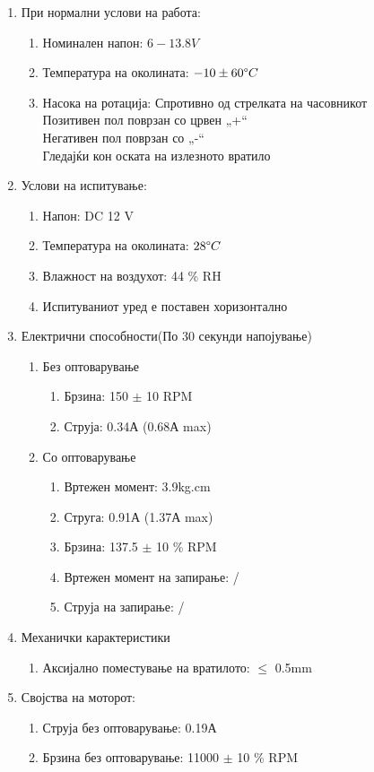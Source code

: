 \documentclass{article}
\begin{document}
\renewcommand{\theenumii}{\arabic{enumii}}
\renewcommand{\theenumiii}{\arabic{enumiii}}
\begin{enumerate}
	\item При нормални услови на работа:
	\begin{enumerate}
		\item Номинален напон: $ 6-13.8 V $
		\item Температура на околината: $ -10 \pm 60 \degree C $
		\item Насока на ротација: Спротивно од стрелката на часовникот\\Позитивен пол поврзан со црвен „+“\\Негативен пол поврзан со „-“\\Гледајќи кон оската на излезното вратило		
	\end{enumerate}
	\item Услови на испитување:
	\begin{enumerate}
		\item Напон: DC 12 V
		\item Температура на околината: $ 28 \degree C $
		\item Влажност на воздухот: 44 \% RH
		\item Испитуваниот уред е поставен хоризонтално
	\end{enumerate}
	\item Електрични способности(По 30 секунди напојување)
	\begin{enumerate}
		\item Без оптоварување
		\begin{enumerate}
			\item Брзина: 150 $\pm$ 10 RPM
			\item Струја: 0.34А (0.68А max)
		\end{enumerate}
		\item Со оптоварување
		\begin{enumerate}
			\item Вртежен момент: 3.9kg.cm
			\item Струга: 0.91А (1.37А max)
			\item Брзина: 137.5 $\pm$ 10 \% RPM
			\item Вртежен момент на запирање: /
			\item Струја на запирање: /
		\end{enumerate}
	\end{enumerate}
	\item Механички карактеристики
	\begin{enumerate}
		\item Аксијално поместување на вратилото: $\leq$ 0.5mm
	\end{enumerate}
	\item Својства на моторот:
	\begin{enumerate}
		\item Струја без оптоварување: 0.19А
		\item Брзина без оптоварување: 11000 $\pm$ 10 \% RPM
	\end{enumerate}
\end{enumerate}	
\end{document}
